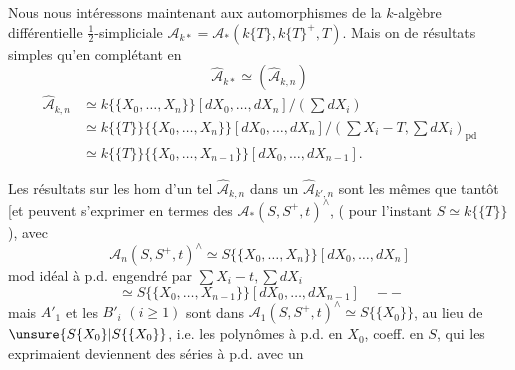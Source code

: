 
Nous nous intéressons maintenant aux automorphismes de la $k$-algèbre différentielle
$\tfrac12$-simpliciale $\mathcal A_{k*}=\mathcal A_*(k\{T\},k\{T\}^+,T)$.
Mais on  de résultats simples qu'en complétant en
\[
 \widehat{\mathcal A}_{k*}\simeq(\widehat{\mathcal A}_{k,n})
\]
\[
 \begin{aligned}
 \widehat{\mathcal A}_{k,n}&\simeq k\{\{X_0,\ldots,X_n\}\}[dX_0,\ldots,dX_n]/(\textstyle\sum dX_i)\\
 &\simeq k\{\{T\}\}\{\{X_0,\ldots,X_n\}\}[dX_0,\ldots,dX_n]/
 (\textstyle\sum X_i-T,\sum dX_i)_{\mathrm{pd}}\\
 &\simeq k\{\{T\}\}\{\{X_0,\ldots,X_{n-1}\}\}[dX_0,\ldots,dX_{n-1}].
 \end{aligned}
\]

Les résultats sur les hom d'un tel $\widehat{\mathcal A}_{k,n}$ dans un
$\widehat{\mathcal A}_{k',n}$ sont les mêmes que tantôt [et peuvent s'exprimer en termes des
$\mathcal A_*(S,S^+,t)^\wedge$, ( pour l'instant $S\simeq k\{\{T\}\}$),
avec
\[
 \mathcal A_n(S,S^+,t)^\wedge\simeq S\{\{X_0,\ldots,X_n\}\}[dX_0,\ldots,dX_n]
\]
mod idéal à p.d. engendré par $\sum X_i-t,\sum dX_i$
\[
 \simeq S\{\{X_0,\ldots,X_{n-1}\}\}[dX_0,\ldots,dX_{n-1}]\quad--
\]
mais $A'_1$ et les $B'_i$ $(i\geq1)$ sont dans
$\mathcal A_1(S,S^+,t)^\wedge\simeq S\{\{X_0\}\}$, au lieu de
$\unsure{S\{X_0\}|S\{\{X_0\}}$, i.e. les polynômes à p.d.
en $X_0$, coeff. en $S$, qui les exprimaient deviennent des séries à p.d. avec un

